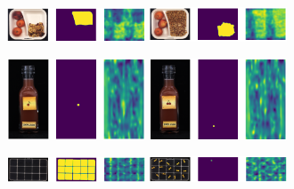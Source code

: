 \begin{figure}[H]
    \captionsetup[subfigure]{justification=centering}
    \centering
    \begin{subfigure}[b]{\textwidth}
        \centering
        \includegraphics[width=0.45\textwidth]{figures/appendix/appendix_main_ensemble/BB/image_prediction_128.png}
        \hfill
        \includegraphics[width=0.45\textwidth]{figures/appendix/appendix_main_ensemble/BB/image_prediction_272.png}

    \end{subfigure}
    \begin{subfigure}[b]{\textwidth}
        \centering
        \includegraphics[width=0.45\textwidth]{figures/appendix/appendix_main_ensemble/JB/image_prediction_268.png}
        \hfill
        \includegraphics[width=0.45\textwidth]{figures/appendix/appendix_main_ensemble/JB/image_prediction_306.png}

    \end{subfigure}
    \begin{subfigure}[b]{\textwidth}
        \centering
        \includegraphics[width=0.45\textwidth]{figures/appendix/appendix_main_ensemble/PP/image_prediction_199.png}
        \hfill
        \includegraphics[width=0.45\textwidth]{figures/appendix/appendix_main_ensemble/PP/image_prediction_308.png}


\end{subfigure}
\end{figure}
